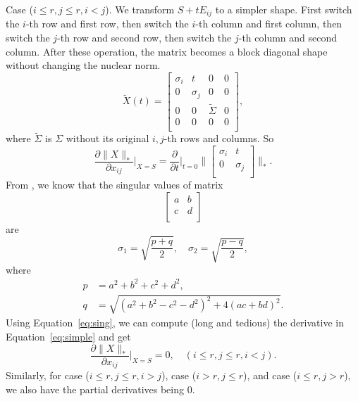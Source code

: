 Case ($i\le r,j\le r,i<j$).
We transform $S+tE_{ij}$ to a simpler shape.
First switch the $i$-th row and first row,
then switch the $i$-th column and first column,
then switch the $j$-th row and second row,
then switch the $j$-th column and second column.
After these operation,
the matrix becomes a block diagonal shape without changing the nuclear norm.
\begin{equation}
    \tilde X(t)=\begin{bmatrix}
    \sigma_i & t        & 0            & 0 \\
    0        & \sigma_j & 0            & 0 \\
    0        & 0        & \tilde\Sigma & 0 \\
    0        & 0        & 0            & 0 \\
\end{bmatrix},
\end{equation}
where $\tilde\Sigma$ is $\Sigma$ without its original $i,j$-th rows and columns.
So
\begin{equation}\label{eq:simple}
    \frac{\partial\|X\|_*}{\partial x_{ij}}\bigg|_{X=S}
        =\frac{\partial}{\partial t}\bigg|_{t=0}
            \bigg\|\begin{bmatrix}
                \sigma_i & t        \\
                0        & \sigma_j \\
            \end{bmatrix}\bigg\|_*.
\end{equation}
From \cite{svd},
we know that the singular values of matrix
\begin{equation}
    \begin{bmatrix}
        a & b \\
        c & d \\
    \end{bmatrix}
\end{equation}
are
\begin{equation}\label{eq:sing}
    \sigma_1=\sqrt{\frac{p+q}{2}},\quad
    \sigma_2=\sqrt{\frac{p-q}{2}},
\end{equation}
where
\begin{equation}
\begin{split}
    p &= a^2+b^2+c^2+d^2, \\
    q &= \sqrt{(a^2+b^2-c^2-d^2)^2+4(ac+bd)^2}.
\end{split}
\end{equation}
Using Equation~\eqref{eq:sing},
we can compute (long and tedious) the derivative in Equation~\eqref{eq:simple}
and get
\begin{equation}
    \frac{\partial\|X\|_*}{\partial x_{ij}}\bigg|_{X=S}
        = 0,\quad (i\le r,j\le r,i<j).
\end{equation}
Similarly,
for
case ($i\le r,j\le r,i>j$),
case ($i>r, j\le r$),
and case ($i\le r, j>r$),
we also have the partial derivatives being $0$.

